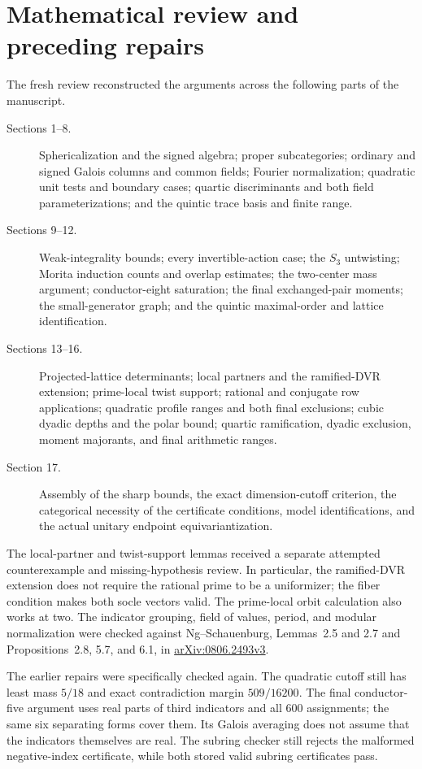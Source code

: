 \documentclass[11pt,a4paper]{article}
\begin{document}
\section{Mathematical review and preceding repairs}

The fresh review reconstructed the arguments across the following
parts of the manuscript.
\begin{description}
\item[Sections 1--8.]
Sphericalization and the signed algebra; proper subcategories;
ordinary and signed Galois columns and common fields; Fourier
normalization; quadratic unit tests and boundary cases; quartic
discriminants and both field parameterizations; and the quintic
trace basis and finite range.
\item[Sections 9--12.]
Weak-integrality bounds; every invertible-action case; the $S_3$
untwisting; Morita induction counts and overlap estimates; the
two-center mass argument; conductor-eight saturation; the final
exchanged-pair moments; the small-generator graph; and the quintic
maximal-order and lattice identification.
\item[Sections 13--16.]
Projected-lattice determinants; local partners and the ramified-DVR
extension; prime-local twist support; rational and conjugate row
applications; quadratic profile ranges and both final exclusions;
cubic dyadic depths and the polar bound; quartic ramification,
dyadic exclusion, moment majorants, and final arithmetic ranges.
\item[Section 17.]
Assembly of the sharp bounds, the exact dimension-cutoff criterion,
the categorical necessity of the certificate conditions, model
identifications, and the actual unitary endpoint equivariantization.
\end{description}

The local-partner and twist-support lemmas received a separate
attempted counterexample and missing-hypothesis review. In particular,
the ramified-DVR extension does not require the rational prime to
be a uniformizer; the fiber condition makes both socle vectors valid.
The prime-local orbit calculation also works at two. The indicator
grouping, field of values, period, and modular normalization were
checked against Ng--Schauenburg, Lemmas~2.5 and 2.7 and
Propositions~2.8, 5.7, and 6.1, in
\href{https://arxiv.org/pdf/0806.2493v3}{arXiv:0806.2493v3}.

The earlier repairs were specifically checked again. The quadratic
cutoff still has least mass $5/18$ and exact contradiction margin
$509/16200$. The final conductor-five argument uses real parts of
third indicators and all $600$ assignments; the same six separating
forms cover them. Its Galois averaging does not assume that the
indicators themselves are real. The subring checker still rejects
the malformed negative-index certificate, while both stored valid
subring certificates pass.
\end{document}
